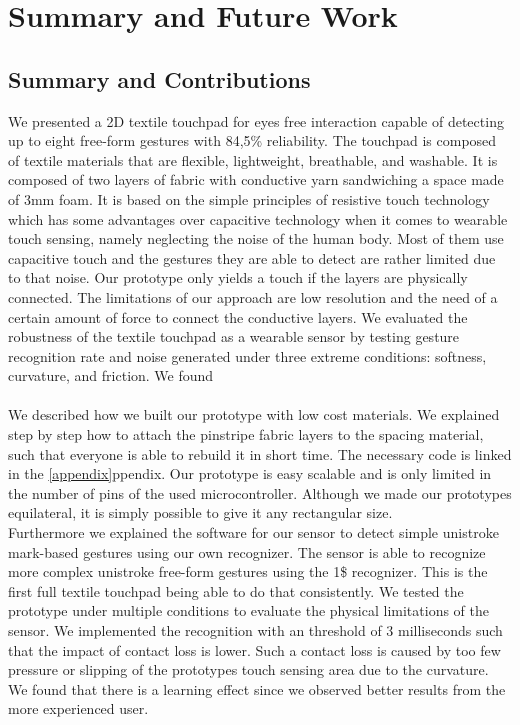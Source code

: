 %

\chapter{Summary and Future Work}
\label{summaryandfuturework}

\section{Summary and Contributions}
\label{summaryandfuturework.summary}
We presented a 2D textile touchpad for eyes free interaction capable of detecting up to eight free-form gestures with 84,5\% reliability. The touchpad is composed of textile materials that are flexible, lightweight, breathable, and washable. It is composed of two layers of fabric with conductive yarn sandwiching a space made of 3mm foam. It is based on the simple principles of resistive touch technology which has some advantages over capacitive technology when it comes to wearable touch sensing, namely neglecting the noise of the human body. Most of them use capacitive touch and the gestures they are able to detect are rather limited due to that noise. Our prototype only yields a touch if the layers are physically connected. The limitations of our approach are low resolution and the need of a certain amount of force to connect the conductive layers. We evaluated the robustness of the textile touchpad as a wearable sensor by testing gesture recognition rate and noise generated under three extreme conditions: softness, curvature, and friction. We found 
\\ \\
We described how we built our prototype with low cost materials. We explained step by step how to attach the pinstripe fabric layers to the spacing material, such that everyone is able to rebuild it in short time. The necessary code is linked in the \ref{appendix}ppendix. Our prototype is easy scalable and is only limited in the number of pins of the used microcontroller. Although we made our prototypes equilateral, it is simply possible to give it any rectangular size. 
\\
Furthermore we explained the software for our sensor to detect simple unistroke mark-based gestures using our own recognizer. The sensor is able to recognize more complex unistroke free-form gestures using the 1\$ recognizer. This is the first full textile touchpad being able to do that consistently. We tested the prototype under multiple conditions to evaluate the physical limitations of the sensor. We implemented the recognition with an threshold of 3 milliseconds such that the impact of contact loss is lower. Such a contact loss is caused by too few pressure or slipping of the prototypes touch sensing area due to the curvature. We found that there is a learning effect since we observed better results from the more experienced user. 
